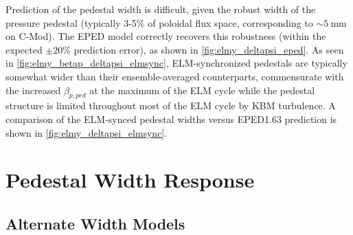 \begin{figure}[t]
 \pushtooutside
\end{figure}

Prediction of the pedestal width is difficult, given the robust width of the pressure pedestal (typically 3-5\% of poloidal flux space, corresponding to $\sim \SI{5}{\milli\meter}$ on C-Mod).  The EPED model correctly recovers this robustness (within the expected $\pm 20\%$ prediction error), as shown in \cref{fig:elmy_deltapsi_eped}.  As seen in \cref{fig:elmy_betap_deltapsi_elmsync}, ELM-synchronized pedestals are typically somewhat wider than their ensemble-averaged counterparts, commensurate with the increased $\beta_{p,ped}$ at the maximum of the ELM cycle while the pedestal structure is limited throughout most of the ELM cycle by KBM turbulence.  A comparison of the ELM-synced pedestal widths versus EPED1.63 prediction is shown in \cref{fig:elmy_deltapsi_elmsync}.\nicesectionending

\section{Pedestal Width Response}\label{sec:elmy_width}

\subsection{Alternate Width Models}\label{subsec:elmy_width_oldmodels}

